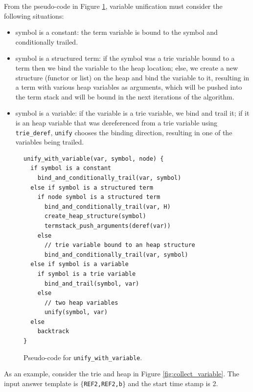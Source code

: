 From the pseudo-code in Figure \ref{fig:unify_with_variable}, variable unification
must consider the following situations:

\begin{itemize}
  \item symbol is a constant: the term variable is bound to the symbol and conditionally trailed.
  \item symbol is a structured term: if the symbol was a trie variable bound to a term then we bind the variable to the heap location; else, we create a new structure (functor or list) on the heap and bind the variable to it, resulting in a term with various heap variables as arguments, which will be pushed into the term stack and will be bound in the next iterations of the algorithm.
  \item symbol is a variable: if the variable is a trie variable, we bind and trail it; if it is an heap variable that was dereferenced from a trie variable using \texttt{trie\_deref}, \texttt{unify} chooses the binding direction, resulting in one of the variables being trailed.
\end{itemize}

\begin{figure}[ht]
\begin{Verbatim}
unify_with_variable(var, symbol, node) {
  if symbol is a constant
    bind_and_conditionally_trail(var, symbol)
  else if symbol is a structured term
    if node symbol is a structured term
      bind_and_conditionally_trail(var, H)
      create_heap_structure(symbol)
      termstack_push_arguments(deref(var))
    else
      // trie variable bound to an heap structure
      bind_and_conditionally_trail(var, symbol)
  else if symbol is a variable
    if symbol is a trie variable
      bind_and_trail(symbol, var)
    else
      // two heap variables
      unify(symbol, var)
  else
    backtrack
}
\end{Verbatim}
\caption{Pseudo-code for \texttt{unify\_with\_variable}.}
\label{fig:unify_with_variable}
\end{figure}

As an example, consider the trie and heap in Figure \ref{fig:collect_variable}.
The input answer template is $\{$\texttt{REF2,REF2,b}$\}$ and the start time stamp is 2.

